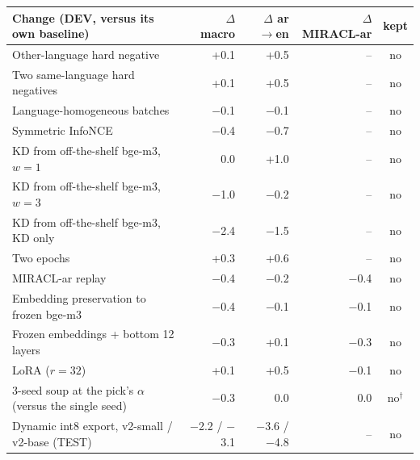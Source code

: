 \begin{tabular}{@{}lrrrc@{}}
\toprule
Change (DEV, versus its own baseline) & $\Delta$ macro & $\Delta$ ar$\to$en & $\Delta$ MIRACL-ar & kept \\
\midrule
Other-language hard negative & +0.1 & +0.5 & -- & no \\
Two same-language hard negatives & +0.1 & +0.5 & -- & no \\
Language-homogeneous batches & $-$0.1 & $-$0.1 & -- & no \\
Symmetric InfoNCE & $-$0.4 & $-$0.7 & -- & no \\
KD from off-the-shelf bge-m3, $w{=}1$ & 0.0 & +1.0 & -- & no \\
KD from off-the-shelf bge-m3, $w{=}3$ & $-$1.0 & $-$0.2 & -- & no \\
KD from off-the-shelf bge-m3, KD only & $-$2.4 & $-$1.5 & -- & no \\
Two epochs & +0.3 & +0.6 & -- & no \\
MIRACL-ar replay & $-$0.4 & $-$0.2 & $-$0.4 & no \\
Embedding preservation to frozen bge-m3 & $-$0.4 & $-$0.1 & $-$0.1 & no \\
Frozen embeddings + bottom 12 layers & $-$0.3 & +0.1 & $-$0.3 & no \\
LoRA ($r{=}32$) & +0.1 & +0.5 & $-$0.1 & no \\
3-seed soup at the pick's $\alpha$ (versus the single seed) & $-$0.3 & 0.0 & 0.0 & no$^\dagger$ \\
\midrule
Dynamic int8 export, v2-small / v2-base (TEST) & $-$2.2 / $-$3.1 & $-$3.6 / $-$4.8 & -- & no \\
\bottomrule
\end{tabular}
